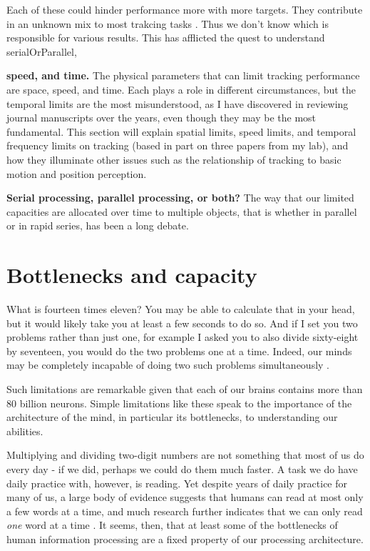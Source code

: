 \documentclass[
]{book}
\begin{document}
Each of these could hinder performance more with more targets. They contribute in an unknown mix to most trakcing tasks .
Thus we don't know which is responsible for various results. This has afflicted the quest to understand serialOrParallel,

\textbf{speed, and time.} The physical parameters that can limit tracking performance are space, speed, and time. Each plays a role in different circumstances, but the temporal limits are the most misunderstood, as I have discovered in reviewing journal manuscripts over the years, even though they may be the most fundamental. This section will explain spatial limits, speed limits, and temporal frequency limits on tracking (based in part on three papers from my lab), and how they illuminate other issues such as the relationship of tracking to basic motion and position perception.

\textbf{Serial processing, parallel processing, or both?} The way that our limited capacities are allocated over time to multiple objects, that is whether in parallel or in rapid series, has been a long debate.

\hypertarget{bottlenecks}{%
\chapter{Bottlenecks and capacity}\label{bottlenecks}}

What is fourteen times eleven? You may be able to calculate that in your head, but it would likely take you at least a few seconds to do so. And if I set you two problems rather than just one, for example I asked you to also divide sixty-eight by seventeen, you would do the two problems one at a time. Indeed, our minds may be completely incapable of doing two such problems simultaneously \citep{oberauerAccessInformationWorking2002, zylberbergBrainRouterCortical2010a}.

Such limitations are remarkable given that each of our brains contains more than 80 billion neurons. Simple limitations like these speak to the importance of the architecture of the mind, in particular its bottlenecks, to understanding our abilities.

Multiplying and dividing two-digit numbers are not something that most of us do every day - if we did, perhaps we could do them much faster. A task we do have daily practice with, however, is reading. Yet despite years of daily practice for many of us, a large body of evidence suggests that humans can read at most only a few words at a time, and much research further indicates that we can only read \emph{one} word at a time \citep{whiteEvidenceSerialProcessing2018, reichleEncodingMultipleWords2009}. It seems, then, that at least some of the bottlenecks of human information processing are a fixed property of our processing architecture.
\end{document}
